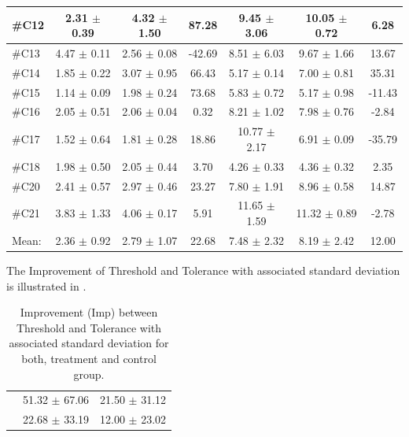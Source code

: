 \begin{longtable} {l|c|c|c|c|c|c}
\#C12 & 2.31 $\pm$ 0.39 & 4.32 $\pm$ 1.50 & 87.28 	& 9.45 $\pm$ 3.06 & 10.05 $\pm$ 0.72 & 6.28 \\ \hline
\#C13 & 4.47 $\pm$ 0.11 & 2.56 $\pm$	0.08 & -42.69 & 8.51 $\pm$ 6.03 & 9.67 $\pm$  1.66 & 13.67 \\ \hline
\#C14 & 1.85 $\pm$ 0.22 & 3.07 $\pm$ 0.95 & 66.43	 & 5.17 $\pm$ 0.14  & 7.00 $\pm$ 0.81 & 35.31 \\ \hline
\#C15 & 1.14 $\pm$ 0.09 & 1.98 $\pm$ 0.24 & 73.68 & 5.83 $\pm$ 0.72 & 5.17 $\pm$ 0.98 & -11.43 \\ \hline
\#C16 & 2.05 $\pm$ 0.51 & 2.06 $\pm$ 0.04 & 0.32 & 8.21 $\pm$ 1.02 & 7.98 $\pm$ 0.76 & -2.84 \\ \hline
\#C17 & 1.52 $\pm$ 0.64 & 1.81 $\pm$ 0.28 & 18.86 & 10.77 $\pm$ 2.17 & 6.91 $\pm$ 0.09 & -35.79 \\ \hline
\#C18 & 1.98  $\pm$ 0.50 & 2.05 $\pm$ 0.44 & 3.70 & 4.26  $\pm$ 0.33 &  4.36 $\pm$  0.32 & 2.35 \\ \hline
\#C20 & 2.41 $\pm$  0.57 & 2.97 $\pm$ 0.46 & 23.27  & 7.80 $\pm$ 1.91  &  8.96 $\pm$ 0.58 & 14.87 \\ \hline
\#C21 & 3.83 $\pm$ 1.33 & 4.06 $\pm$  0.17 & 5.91 & 11.65 $\pm$ 1.59  & 11.32 $\pm$ 0.89 & -2.78 \\ \hline
Mean: & 2.36 $\pm$ 0.92 & 2.79 $\pm$ 1.07 & 22.68 & 7.48 $\pm$ 2.32 & 8.19 $\pm$ 2.42 & 12.00 \\ \hline 
\end{longtable}

The Improvement of Threshold and Tolerance with associated standard deviation is illustrated in .

\begin{longtable} {l|c|c}
	\caption{Improvement (Imp) between Threshold and Tolerance with associated standard deviation for both, treatment and control group.}
	\label{tab:Total} \\
\cellcolor[HTML]{C0C0C0}{} &
 \cellcolor[HTML]{C0C0C0}{\textbf{Threshold Imp [\%]}} &  \cellcolor[HTML]{C0C0C0}{\textbf{Tolerance Imp[\%]}} \\ \hline
\cellcolor[HTML]{C0C0C0}{\textbf{Treatment}} & 51.32 $\pm$ 67.06 & 21.50 $\pm$ 31.12 \\ \hline
\cellcolor[HTML]{C0C0C0}{\textbf{Control}} & 22.68 $\pm$ 33.19  & 12.00 $\pm$ 23.02 \\ \hline
\end{longtable}
\vspace{-.5cm} 

